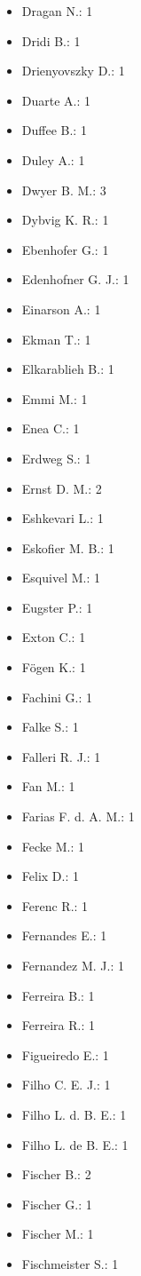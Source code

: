 \begin{itemize}
\item Dragan N.: 1
\item Dridi B.: 1
\item Drienyovszky D.: 1
\item Duarte A.: 1
\item Duffee B.: 1
\item Duley A.: 1
\item Dwyer B. M.: 3
\item Dybvig K. R.: 1
\item Ebenhofer G.: 1
\item Edenhofner G. J.: 1
\item Einarson A.: 1
\item Ekman T.: 1
\item Elkarablieh B.: 1
\item Emmi M.: 1
\item Enea C.: 1
\item Erdweg S.: 1
\item Ernst D. M.: 2
\item Eshkevari L.: 1
\item Eskofier M. B.: 1
\item Esquivel M.: 1
\item Eugster P.: 1
\item Exton C.: 1
\item F\"{o}gen K.: 1
\item Fachini G.: 1
\item Falke S.: 1
\item Falleri R. J.: 1
\item Fan M.: 1
\item Farias F. d. A. M.: 1
\item Fecke M.: 1
\item Felix D.: 1
\item Ferenc R.: 1
\item Fernandes E.: 1
\item Fernandez M. J.: 1
\item Ferreira B.: 1
\item Ferreira R.: 1
\item Figueiredo E.: 1
\item Filho C. E. J.: 1
\item Filho L. d. B. E.: 1
\item Filho L. de B. E.: 1
\item Fischer B.: 2
\item Fischer G.: 1
\item Fischer M.: 1
\item Fischmeister S.: 1

\end{itemize}
